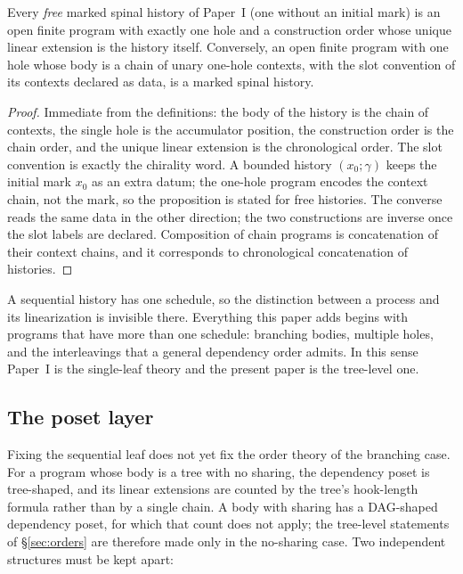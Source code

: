 \begin{proposition}\label{prop:sequential-leaf}
Every \emph{free} marked spinal history of Paper~I (one without an initial mark) is an
open finite program with exactly one hole and a construction order whose unique linear
extension is the history itself.
Conversely, an open finite program with one hole whose body is a chain of unary
one-hole contexts, with the slot convention of its contexts declared as data, is a
marked spinal history.
\end{proposition}

\begin{proof}
Immediate from the definitions: the body of the history is the chain of contexts,
the single hole is the accumulator position, the construction order is the chain
order, and the unique linear extension is the chronological order.  The slot
convention is exactly the chirality word.  A bounded history $(x_0;\gamma)$ keeps the
initial mark $x_0$ as an extra datum; the one-hole program encodes the context chain,
not the mark, so the proposition is stated for free histories.  The converse reads the
same data in the other direction; the two constructions are inverse once the slot
labels are declared.  Composition of chain programs is concatenation of their context
chains, and it corresponds to chronological concatenation of histories.
\end{proof}

\begin{remark}\label{rem:sequential-blind}
A sequential history has one schedule, so the distinction between a process and its
linearization is invisible there.  Everything this paper adds begins with programs
that have more than one schedule: branching bodies, multiple holes, and the
interleavings that a general dependency order admits.  In this sense Paper~I is the
single-leaf theory and the present paper is the tree-level one.
\end{remark}

\subsection{The poset layer}

Fixing the sequential leaf does not yet fix the order theory of the branching case.
For a program whose body is a tree with no sharing, the dependency poset is
tree-shaped, and its linear extensions are counted by the tree's hook-length formula
rather than by a single chain.  A body with sharing has a DAG-shaped dependency poset,
for which that count does not apply; the tree-level statements of \S\ref{sec:orders}
are therefore made only in the no-sharing case.  Two independent structures must be kept apart:


